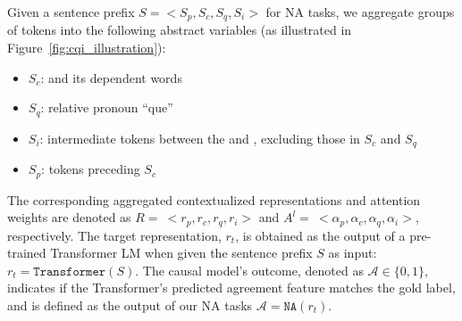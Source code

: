 Given a sentence prefix $S=<S_p,S_c,S_q,S_i>$ for NA tasks, we aggregate groups of tokens into the following abstract variables (as illustrated in Figure~\ref{fig:cqi_illustration}): 

\begin{itemize}[topsep=0pt, partopsep=0pt,itemsep=0pt,parsep=0pt]
    \item $S_c$: \cue and its dependent words
    \item $S_q$: relative pronoun ``que''
    \item $S_i$: intermediate tokens between the \cue and \target, excluding those in $S_c$ and $S_q$
    \item $S_p$: tokens preceding $S_c$
\end{itemize}
The corresponding aggregated contextualized representations and attention weights are denoted as $R=\ <r_p,r_c,r_q,r_i>$ and $A^l=\ <\alpha_p, \alpha_c, \alpha_q, \alpha_i>$, respectively. The target representation, $r_t$, is obtained as the output of a pre-trained Transformer LM when given the sentence prefix $S$ as input: $r_t = \texttt{Transformer}(S)$. The causal model's outcome, denoted as $\mathcal{A} \in \{0,1\}$, indicates if the Transformer's predicted agreement feature matches the gold label, and is defined as the output of our NA tasks $\mathcal{A} = \texttt{NA}(r_t)$.


